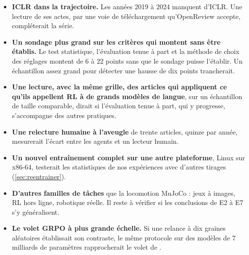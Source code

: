 \begin{itemize}
  \item \textbf{ICLR dans la trajectoire.} Les années 2019 à 2024 manquent d'ICLR. Une lecture de
        ses actes, par une voie de téléchargement qu'OpenReview accepte, compléterait la série.
  \item \textbf{Un sondage plus grand sur les critères qui montent sans être établis.} Le test
        statistique, l'évaluation tenue à part et la méthode de choix des réglages montent de 6 à 22
        points sans que le sondage puisse l'établir. Un échantillon assez grand pour détecter une
        hausse de dix points trancherait.
  \item \textbf{Une lecture, avec la même grille, des articles qui appliquent ce qu'ils appellent RL
        à de grands modèles de langue}, sur un échantillon de taille comparable, dirait si
        l'évaluation tenue à part, qui y progresse, s'accompagne des autres pratiques.
  \item \textbf{Une relecture humaine à l'aveugle} de trente articles, quinze par année, mesurerait l'écart
        entre les agents et un lecteur humain.
  \item \textbf{Un nouvel entraînement complet sur une autre plateforme}, Linux sur x86-64,
        testerait les statistiques de nos expériences avec d'autres tirages (\cref{sec:reentrainer}).
  \item \textbf{D'autres familles de tâches} que la locomotion MuJoCo : jeux à images, RL hors
        ligne, robotique réelle. Il reste à vérifier si les conclusions de E2 à E7 s'y
        généralisent.
  \item \textbf{Le volet GRPO à plus grande échelle.} Si une relance à dix graines aléatoires établissait son contraste, le même protocole sur des modèles de 7 milliards de paramètres rapprocherait le
        volet de \textcite{shao2025spurious}.
\end{itemize}

